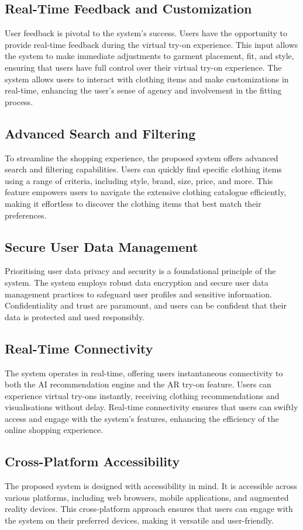 	\subsection{Real-Time Feedback and Customization}
		User feedback is pivotal to the system's success. Users have the opportunity to provide real-time feedback during the virtual try-on experience. This input allows the system to make immediate adjustments to garment placement, fit, and style, ensuring that users have full control over their virtual try-on experience. The system allows users to interact with clothing items and make customizations in real-time, enhancing the user's sense of agency and involvement in the fitting process.

	\subsection{Advanced Search and Filtering}
		To streamline the shopping experience, the proposed system offers advanced search and filtering capabilities. Users can quickly find specific clothing items using a range of criteria, including style, brand, size, price, and more. This feature empowers users to navigate the extensive clothing catalogue efficiently, making it effortless to discover the clothing items that best match their preferences.

	\subsection{Secure User Data Management}
		Prioritising user data privacy and security is a foundational principle of the system. The system employs robust data encryption and secure user data management practices to safeguard user profiles and sensitive information. Confidentiality and trust are paramount, and users can be confident that their data is protected and used responsibly.

	\subsection{Real-Time Connectivity}
		The system operates in real-time, offering users instantaneous connectivity to both the AI recommendation engine and the AR try-on feature. Users can experience virtual try-ons instantly, receiving clothing recommendations and visualisations without delay. Real-time connectivity ensures that users can swiftly access and engage with the system's features, enhancing the efficiency of the online shopping experience.

	\subsection{Cross-Platform Accessibility}
		The proposed system is designed with accessibility in mind. It is accessible across various platforms, including web browsers, mobile applications, and augmented reality devices. This cross-platform approach ensures that users can engage with the system on their preferred devices, making it versatile and user-friendly.
